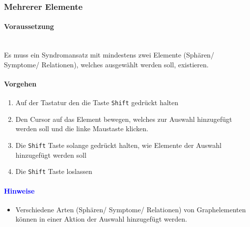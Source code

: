 \documentclass[enabledeprecatedfontcommands,fontsize=11pt,paper=a4,twoside]{scrartcl}
\newcounter{one}
\newcommand*{\hint}{\paragraph{\textcolor{blue}{Hinweise}}}
\newcommand*{\condition}{\paragraph{Voraussetzung}$\;$ \vspace{0.2cm}\\}
\newcommand*{\action}{\paragraph{Vorgehen}}
\begin{document}
		\begin{figure}[ht!]
			\centering
			
		\end{figure}	
	
		\newpage
		\subsubsection{Mehrerer Elemente}
		\condition
		Es muss ein Syndromansatz mit mindestens zwei Elemente (Sphären/ Symptome/ Relationen), welches ausgewählt werden soll, existieren. 
		\action
		\begin{enumerate}
			\item Auf der Tastatur den die Taste \texttt{Shift} gedrückt halten 
			\item Den Cursor auf das Element bewegen, welches zur Auswahl hinzugefügt werden soll und die linke Maustaste klicken. 
			\item Die \texttt{Shift} Taste solange gedrückt halten, wie Elemente der Auswahl hinzugefügt werden soll
			\item Die \texttt{Shift} Taste loslassen
		\end{enumerate}
		\hint
		\begin{itemize}
			\item Verschiedene Arten (Sphären/ Symptome/ Relationen) von Graphelementen können in einer Aktion der Auswahl hinzugefügt werden. \\ 
		\end{itemize}
\end{document}
